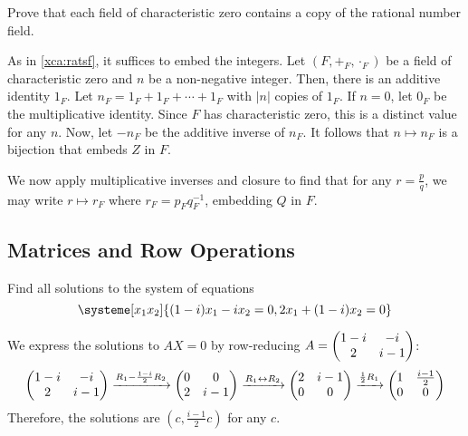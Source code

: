 \begin{xca}
  Prove that each field of characteristic zero contains a copy of the rational number field.
\end{xca}
\begin{prf}
  As in \cref{xca:ratsf}, it suffices to embed the integers.
  Let $(F, +_F, \cdot_F)$ be a field of characteristic zero and $n$ be a non-negative integer.
  Then, there is an additive identity $1_F$.
  Let $n_F = 1_F + 1_F + \dotsb + 1_F$ with $|n|$ copies of $1_F$.
  If $n = 0$, let $0_F$ be the multiplicative identity.
  Since $F$ has characteristic zero, this is a distinct value for any $n$.
  Now, let $-n_F$ be the additive inverse of $n_F$.
  It follows that $n \mapsto n_F$ is a bijection that embeds $Z$ in $F$.

  We now apply multiplicative inverses and closure to find that for any $r = \frac{p}{q}$,
  we may write $r \mapsto r_F$ where $r_F = p_F q_F^{-1}$, embedding $Q$ in $F$.
\end{prf}

\subsection{Matrices and Row Operations}

\begin{xca}
  Find all solutions to the system of equations
  \[ \systeme[x_1x_2]{{(1-i)}x_1 - ix_2 = 0, 2x_1 + {(1-i)}x_2 = 0} \]
\end{xca}
\begin{sol}
  We express the solutions to $AX = 0$ by row-reducing $A = \mqty(1-i&-i\\2&i-1)$:
  \[
    \mqty(1-i&-i\\2&i-1)
    \xto{R_1 - \frac{1-i}{2}R_2} \mqty(0&0\\2&i-1)
    \xto{R_1 \harr R_2} \mqty(2&i-1\\0&0)
    \xto{\frac12 R_1} \mqty(1&\frac{i-1}{2}\\0&0)
  \]
  Therefore, the solutions are $(c, \frac{i-1}{2}c)$ for any $c$.
\end{sol}

